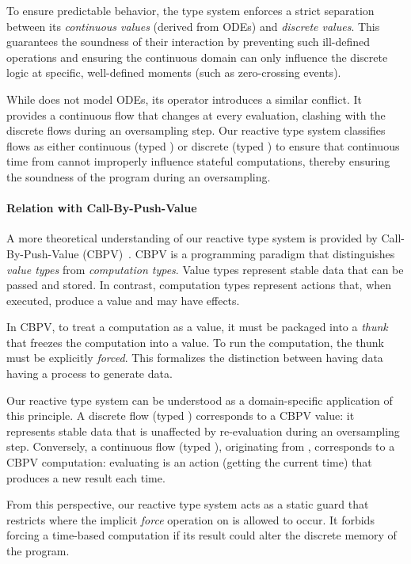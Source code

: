 To ensure predictable behavior, the \Zelus type system enforces a strict separation between its
\emph{continuous values} (derived from ODEs) and \emph{discrete values}. This guarantees the
soundness of their interaction by preventing such ill-defined operations and ensuring the continuous
domain can only influence the discrete logic at specific, well-defined moments (such as
zero-crossing events).

While \GRust does not model ODEs, its \timeop operator introduces a similar conflict. It provides a
continuous flow that changes at every evaluation, clashing with the discrete flows during an
oversampling step. Our reactive type system classifies flows as either continuous (typed \cType) or
discrete (typed \dType) to ensure that continuous time from \timeop cannot improperly influence stateful
computations, thereby ensuring the soundness of the program during an oversampling.

\paragraph{Relation with Call-By-Push-Value}

A more theoretical understanding of our reactive type system is provided by Call-By-Push-Value
(CBPV)~\cite{DBLP:phd/ethos/Levy01}. CBPV is a programming paradigm that distinguishes \emph{value
    types} from \emph{computation types}. Value types represent stable data that can be passed and
stored. In contrast, computation types represent actions that, when executed, produce a value and
may have effects.

In CBPV, to treat a computation as a value, it must be packaged into a \emph{thunk} that freezes
the computation into a value. To run the computation, the thunk must be explicitly \emph{forced}.
This formalizes the distinction between having data \versus having a process to generate data.

Our reactive type system can be understood as a domain-specific application of this principle. A
discrete flow (typed \dType) corresponds to a CBPV value: it represents stable data that is
unaffected by re-evaluation during an oversampling step. Conversely, a continuous flow
(typed \cType), originating from \timeop, corresponds to a CBPV computation: evaluating \timeop is
an action (getting the current time) that produces a new result each time.

From this perspective, our reactive type system acts as a static guard that restricts where the
implicit \emph{force} operation on \timeop is allowed to occur. It forbids forcing a time-based
computation if its result could alter the discrete memory of the program.

